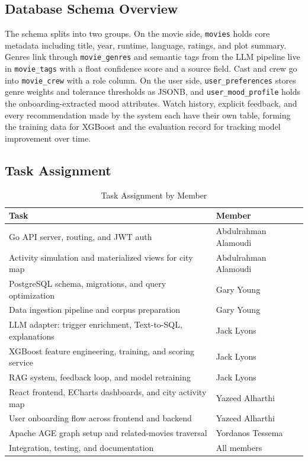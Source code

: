 \documentclass[conference]{IEEEtran}
\begin{document}
\newpage
\appendix

\subsection*{Database Schema Overview}

The schema splits into two groups. On the movie side, \texttt{movies} holds core metadata including title, year, runtime, language, ratings, and plot summary. Genres link through \texttt{movie\_genres} and semantic tags from the LLM pipeline live in \texttt{movie\_tags} with a float confidence score and a source field. Cast and crew go into \texttt{movie\_crew} with a role column. On the user side, \texttt{user\_preferences} stores genre weights and tolerance thresholds as JSONB, and \texttt{user\_mood\_profile} holds the onboarding-extracted mood attributes. Watch history, explicit feedback, and every recommendation made by the system each have their own table, forming the training data for XGBoost and the evaluation record for tracking model improvement over time.

\vspace{6pt}

\subsection*{Task Assignment}

\begin{table}[h]
\centering
\renewcommand{\arraystretch}{1.3}
\caption{Task Assignment by Member}
\setlength{\tabcolsep}{5pt}
\begin{tabular}{>{\raggedright\arraybackslash}p{5.6cm} >{\raggedright\arraybackslash}p{2.5cm}}
\toprule
\textbf{Task} & \textbf{Member} \\
\midrule
Go API server, routing, and JWT auth & Abdulrahman Alamoudi \\
Activity simulation and materialized views for city map & Abdulrahman Alamoudi \\
PostgreSQL schema, migrations, and query optimization & Gary Young \\
Data ingestion pipeline and corpus preparation & Gary Young \\
LLM adapter: trigger enrichment, Text-to-SQL, explanations & Jack Lyons \\
XGBoost feature engineering, training, and scoring service & Jack Lyons \\
RAG system, feedback loop, and model retraining & Jack Lyons \\
React frontend, ECharts dashboards, and city activity map & Yazeed Alharthi \\
User onboarding flow across frontend and backend & Yazeed Alharthi \\
Apache AGE graph setup and related-movies traversal & Yordanos Tessema \\
Integration, testing, and documentation & All members \\
\bottomrule
\end{tabular}
\end{table}
\end{document}

